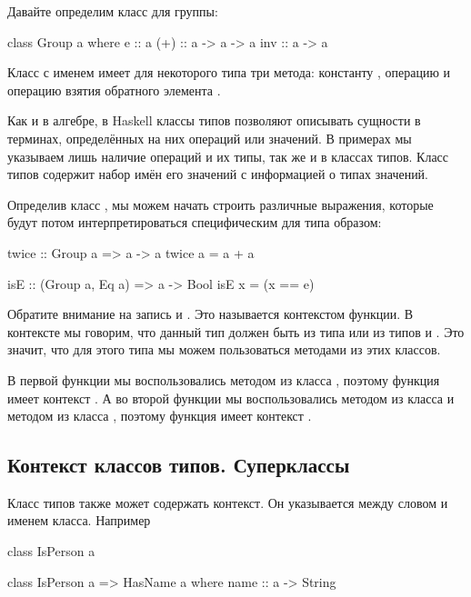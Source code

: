 Давайте определим класс для группы:

\begin{code}
class Group a where
    e   :: a
    (+) :: a -> a -> a
    inv :: a -> a
\end{code}

Класс с именем  имеет для некоторого типа  
три метода: константу , операцию 
и операцию взятия обратного элемента .

Как и в алгебре, в Haskell классы типов позволяют описывать 
сущности в терминах, определённых на них операций или значений.
В примерах мы указываем лишь наличие операций и их типы, так же
и в классах типов. Класс типов содержит набор имён его значений 
с информацией о типах значений.

Определив класс , мы можем начать строить 
различные выражения, которые будут потом интерпретироваться
специфическим для типа образом:

\begin{code}
twice :: Group a => a -> a
twice a = a + a

isE :: (Group a, Eq a) => a -> Bool
isE x = (x == e)
\end{code}

Обратите внимание на запись  и 
. Это называется контекстом функции. 
В контексте мы говорим, что данный тип должен быть из 
типа  или из типов  и . Это
значит, что для этого типа мы можем пользоваться методами
из этих классов.

В первой функции  мы воспользовались методом
\In{(+)} из класса , поэтому функция имеет
контекст . А во второй функции  
мы воспользовались методом  из класса  и
методом \In{(==)} из класса , поэтому функция
имеет контекст .

\subsection{Контекст классов типов. Суперклассы}

Класс типов также может содержать контекст. Он указывается
между словом  и именем класса. Например


\begin{code}
class IsPerson a

class IsPerson a => HasName a where
    name :: a -> String
\end{code}

